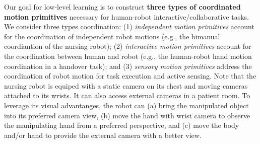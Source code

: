 \documentclass[letterpaper, 11 pt, onecolumn]{article}
\begin{document}
Our goal for low-level learning is to construct \textbf{three types of coordinated motion primitives} necessary for human-robot interactive/collaborative tasks. We consider three types coordination: (1) \textit{independent motion primitives} account for the coordination of independent robot motions (e.g., the bimanual coordiantion of the nursing robot); (2) \textit{interactive motion primitives} account for the coordination between human and robot (e.g., the human-robot hand motion coordination in a handover task); and (3) \textit{sensory motion primitives} address the coordination of robot motion for task execution and active sensing. Note that the nursing robot is equiped with a static camera on its chest and moving cameras attached to its wrists. It can also access external cameras in a patient room. To leverage its visual advantanges, the robot can (a) bring the manipulated object into its preferred camera view, (b) move the hand with wrist camera to observe the manipulating hand from a preferred perspective, and (c) move the body and/or hand to provide the external camera with a better view. 
\end{document}
